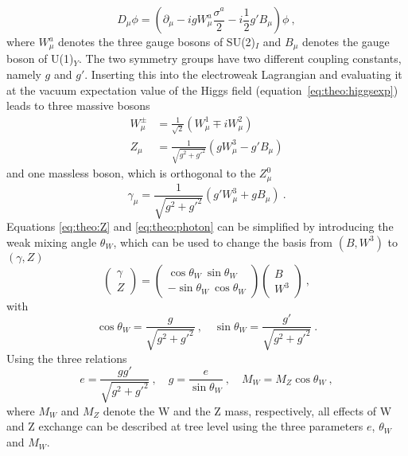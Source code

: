 \begin{equation}
D_\mu \phi = \left( \partial_\mu -igW_\mu^a\frac{\sigma^a}{2} - i\frac{1}{2}g'B_\mu \right)\phi ~,
\end{equation}
where $W_\mu^a$ denotes the three gauge bosons of SU(2)$_I$ and $B_\mu$ denotes the gauge boson of U(1)$_Y$. The two symmetry groups have two different coupling constants, namely $g$ and $g'$. Inserting this into the electroweak Lagrangian and evaluating it at the vacuum expectation value of the Higgs field (equation~\ref{eq:theo:higgsexp}) leads to three massive bosons
\begin{align}
W_\mu^\pm &= \frac{1}{\sqrt{2}}\left( W_\mu^1 \mp iW_\mu^2 \right) \\
Z_\mu &= \frac{1}{\sqrt{g^2+g'^2}}\left( gW_\mu^3-g'B_\mu\right) \label{eq:theo:Z}
\end{align}
and one massless boson, which is orthogonal to the $Z_\mu^0$
\begin{equation}
\gamma_\mu = \frac{1}{\sqrt{g^2+g'^2}}\left( g'W_\mu^3 + gB_\mu \right) ~. \label{eq:theo:photon}
\end{equation}
Equations \ref{eq:theo:Z} and \ref{eq:theo:photon} can be simplified by introducing the weak mixing angle $\theta_W$, which can be used to change the basis from $(B,W^3)$ to $(\gamma,Z)$
\begin{equation}
\left( \begin{array}{c} \gamma \\ Z \end{array} \right) = \left( \begin{array}{c} \cos \theta_W ~  \sin \theta_W \\ -\sin \theta_W ~  \cos \theta_W \end{array} \right) \left( \begin{array}{c} B \\ W^3 \end{array} \right) ~,
\end{equation}
with 
\begin{equation}
\cos \theta_W = \frac{g}{\sqrt{g^2+g'^2}} ~, \quad \sin \theta_W = \frac{g'}{\sqrt{g^2+g'^2}} ~.
\end{equation}
Using the three relations
\begin{equation}
e=\frac{gg'}{\sqrt{g^2+g'^2}} ~, \quad g=\frac{e}{\sin \theta_W} ~, \quad M_W=M_Z \cos \theta_W ~,
\end{equation}
where $M_W$ and $M_Z$ denote the W and the Z mass, respectively, all effects of W and Z exchange can be described at tree level using the three parameters $e$, $\theta_W$ and $M_W$.\\

